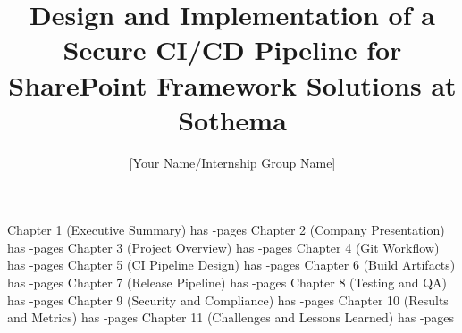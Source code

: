 \documentclass[12pt,a4paper,oneside,english]{book}
\author{[Your Name/Internship Group Name]}
\title{Design and Implementation of a Secure CI/CD Pipeline for SharePoint Framework Solutions at Sothema}
\begin{document}

\dominitoc
{}








\noindent
Chapter 1 (Executive Summary) has \the\numexpr{}-\relax\space pages \newline
Chapter 2 (Company Presentation) has \the\numexpr{}-\relax\space pages \newline
Chapter 3 (Project Overview) has \the\numexpr{}-\relax\space pages \newline
Chapter 4 (Git Workflow) has \the\numexpr{}-\relax\space pages \newline
Chapter 5 (CI Pipeline Design) has \the\numexpr{}-\relax\space pages \newline
Chapter 6 (Build Artifacts) has \the\numexpr{}-\relax\space pages \newline
Chapter 7 (Release Pipeline) has \the\numexpr{}-\relax\space pages \newline
Chapter 8 (Testing and QA) has \the\numexpr{}-\relax\space pages \newline
Chapter 9 (Security and Compliance) has \the\numexpr{}-\relax\space pages \newline
Chapter 10 (Results and Metrics) has \the\numexpr{}-\relax\space pages \newline
Chapter 11 (Challenges and Lessons Learned) has \the\numexpr{}-\relax\space pages \newline
\end{document}
